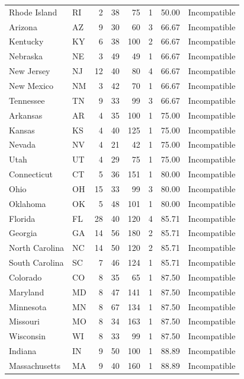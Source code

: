 \begin{longtable}{llrrrrrl}
Rhode Island  & RI &  2 &  38 &  75 & 1 &  50.00 & Incompatible \\
Arizona       & AZ &  9 &  30 &  60 & 3 &  66.67 & Incompatible \\
Kentucky      & KY &  6 &  38 & 100 & 2 &  66.67 & Incompatible \\
Nebraska      & NE &  3 &  49 &  49 & 1 &  66.67 & Incompatible \\
New Jersey    & NJ & 12 &  40 &  80 & 4 &  66.67 & Incompatible \\
New Mexico    & NM &  3 &  42 &  70 & 1 &  66.67 & Incompatible \\
Tennessee     & TN &  9 &  33 &  99 & 3 &  66.67 & Incompatible \\
Arkansas      & AR &  4 &  35 & 100 & 1 &  75.00 & Incompatible \\
Kansas        & KS &  4 &  40 & 125 & 1 &  75.00 & Incompatible \\
Nevada        & NV &  4 &  21 &  42 & 1 &  75.00 & Incompatible \\
Utah          & UT &  4 &  29 &  75 & 1 &  75.00 & Incompatible \\
Connecticut   & CT &  5 &  36 & 151 & 1 &  80.00 & Incompatible \\
Ohio          & OH & 15 &  33 &  99 & 3 &  80.00 & Incompatible \\
Oklahoma      & OK &  5 &  48 & 101 & 1 &  80.00 & Incompatible \\
Florida       & FL & 28 &  40 & 120 & 4 &  85.71 & Incompatible \\
Georgia       & GA & 14 &  56 & 180 & 2 &  85.71 & Incompatible \\
North Carolina& NC & 14 &  50 & 120 & 2 &  85.71 & Incompatible \\
South Carolina& SC &  7 &  46 & 124 & 1 &  85.71 & Incompatible \\
Colorado      & CO &  8 &  35 &  65 & 1 &  87.50 & Incompatible \\
Maryland      & MD &  8 &  47 & 141 & 1 &  87.50 & Incompatible \\
Minnesota     & MN &  8 &  67 & 134 & 1 &  87.50 & Incompatible \\
Missouri      & MO &  8 &  34 & 163 & 1 &  87.50 & Incompatible \\
Wisconsin     & WI &  8 &  33 &  99 & 1 &  87.50 & Incompatible \\
Indiana       & IN &  9 &  50 & 100 & 1 &  88.89 & Incompatible \\
Massachusetts & MA &  9 &  40 & 160 & 1 &  88.89 & Incompatible \\

\end{longtable}
